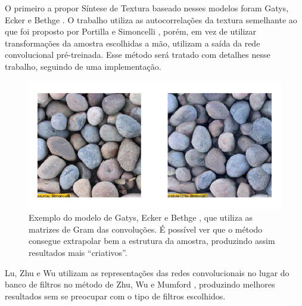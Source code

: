 O primeiro a propor Síntese
de Textura baseado nesses modelos foram
Gatys, Ecker e Bethge \cite{Gatys2015}.
O trabalho utiliza as autocorrelações
da textura semelhante ao que foi proposto
por Portilla e Simoncelli \cite{Portilla1999}, porém, em
vez de utilizar transformações da amostra
escolhidas a mão, utilizam a saída da
rede convolucional pré-treinada. 
Esse método será tratado com detalhes
nesse trabalho, seguindo de uma implementação.

\begin{figure}[!ht]
	\centering
	\includegraphics[width=\linewidth*2/3]{files/assets/articles/gatys1.png}
	\caption{Exemplo do modelo de Gatys, Ecker e Bethge \cite{Gatys2015},
	que utiliza as matrizes de Gram das convoluções.
	É possível ver que o método consegue extrapolar bem
	a estrutura da amostra, produzindo assim
	resultados mais ``criativos''.}
	\label{img:preview}
\end{figure}


Lu, Zhu e Wu \cite{Lu2016}
utilizam as representações
das redes convolucionais
no lugar do banco de filtros
no método de Zhu, Wu e Mumford \cite{Zhu1998},
produzindo melhores resultados sem
se preocupar com o tipo de filtros
escolhidos.




